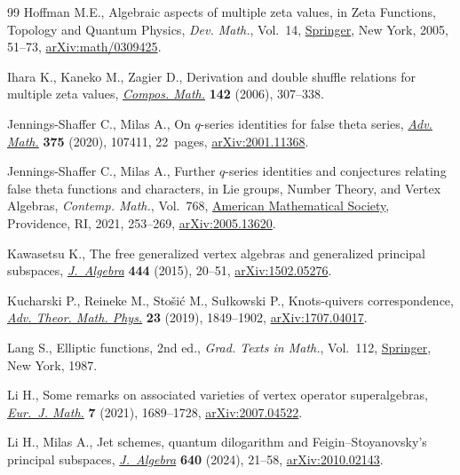 \documentclass[pdftex]{sigma}
\numberwithin{equation}{section}
\theoremstyle{definition}
\begin{document}
\begin{thebibliography}{99}
Hoffman M.E., Algebraic aspects of multiple zeta values, in Zeta Functions,
 Topology and Quantum Physics, \textit{Dev. Math.}, Vol.~14,
 \href{https://doi.org/10.1007/0-387-24981-8_4}{Springer}, New York, 2005,
 51--73, \href{https://arxiv.org/abs/math/0309425}{arXiv:math/0309425}.

Ihara K., Kaneko M., Zagier D., Derivation and double shuffle relations for
 multiple zeta values,
 \href{https://doi.org/10.1112/S0010437X0500182X}{\textit{Compos. Math.}}
 \textbf{142} (2006), 307--338.

Jennings-Shaffer C., Milas A., On {$q$}-series identities for false theta
 series, \href{https://doi.org/10.1016/j.aim.2020.107411}{\textit{Adv. Math.}}
 \textbf{375} (2020), 107411, 22~pages,
 \href{https://arxiv.org/abs/2001.11368}{arXiv:2001.11368}.

Jennings-Shaffer C., Milas A., Further {$q$}-series identities and conjectures
 relating false theta functions and characters, in Lie groups, Number Theory,
 and Vertex Algebras, \textit{Contemp. Math.}, Vol.~768,
 \href{https://doi.org/10.1090/conm/768/15467}{American Mathematical Society},
 Providence, RI, 2021, 253--269,
 \href{https://arxiv.org/abs/2005.13620}{arXiv:2005.13620}.

Kawasetsu K., The free generalized vertex algebras and generalized principal
 subspaces,
 \href{https://doi.org/10.1016/j.jalgebra.2015.07.014}{\textit{J.~Algebra}}
 \textbf{444} (2015), 20--51,
 \href{https://arxiv.org/abs/1502.05276}{arXiv:1502.05276}.

Kucharski P., Reineke M., Sto\v{s}i\'{c} M., Su{\l}kowski P., Knots-quivers
 correspondence,
 \href{https://doi.org/10.4310/atmp.2019.v23.n7.a4}{\textit{Adv. Theor. Math.
 Phys.}} \textbf{23} (2019), 1849--1902,
 \href{https://arxiv.org/abs/1707.04017}{arXiv:1707.04017}.

Lang S., Elliptic functions, 2nd ed., \textit{Grad. Texts in Math.}, Vol.~112,
 \href{https://doi.org/10.1007/978-1-4612-4752-4}{Springer}, New York, 1987.

Li H., Some remarks on associated varieties of vertex operator superalgebras,
 \href{https://doi.org/10.1007/s40879-021-00477-6}{\textit{Eur.~J. Math.}}
 \textbf{7} (2021), 1689--1728,
 \href{https://arxiv.org/abs/2007.04522}{arXiv:2007.04522}.

Li H., Milas A., Jet schemes, quantum dilogarithm and {F}eigin--{S}toyanovsky's
 principal subspaces,
 \href{https://doi.org/10.1016/j.jalgebra.2023.10.033}{\textit{J.~Algebra}}
 \textbf{640} (2024), 21--58,
 \href{https://arxiv.org/abs/2010.02143}{arXiv:2010.02143}.


\end{thebibliography}
\end{document}

